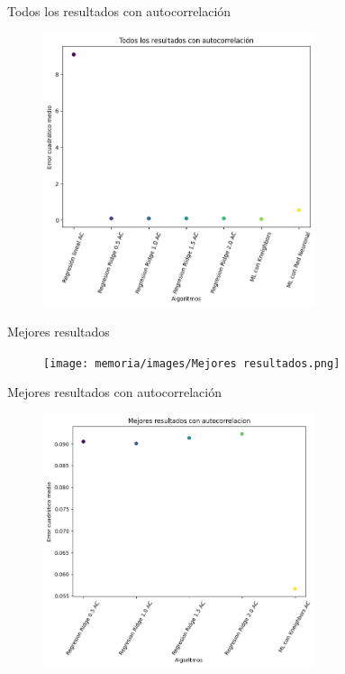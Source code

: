 \documentclass{beamer}
\begin{document}
\begin{frame}{Todos los resultados con autocorrelación}
    
\begin{figure}
\centering
\includegraphics[width=8cm]{memoria/images/Todos los resultados con autocorrelación.png}
\end{figure}

\end{frame}

\begin{frame}{Mejores resultados}
    
\begin{figure}
\centering
\texttt{[image: memoria/images/Mejores resultados.png]}
\end{figure}

\end{frame}

\begin{frame}{Mejores resultados con autocorrelación}
    
\begin{figure}
\centering
\includegraphics[width=8cm]{memoria/images/Mejores resultados con autocorrelación.png}
\end{figure}

\end{frame}
\end{document}
